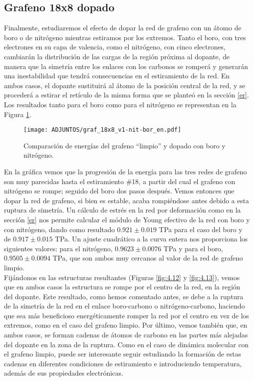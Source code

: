 \subsection{Grafeno 18x8 dopado}

Finalmente, estudiaremos el efecto de dopar la red de grafeno con un átomo de boro o de nitrógeno mientras estiramos por los extremos. Tanto el boro, con tres electrones en su capa de valencia, como el nitrógeno, con cinco electrones, cambiarán la distribución de las cargas de la región próxima al dopante, de manera que la simetría entre los enlaces con los carbonos se romperá y generarán una inestabilidad que tendrá consecuencias en el estiramiento de la red. En ambos casos, el dopante sustituirá al átomo de la posición central de la red, y se procederá a estirar el retículo de la misma forma que se planteó en la sección \ref{er}. Los resultados tanto para el boro como para el nitrógeno se representan en la Figura \ref{fig:4.11}.
 \begin{figure}[!h]
     \centering
     \texttt{[image: ADJUNTOS/graf\_18x8\_v1-nit-bor\_en.pdf]}
     \caption{Comparación de energías del grafeno ``limpio'' y dopado con boro y nitrógeno.}
     \label{fig:4.11}
 \end{figure}
En la gráfica vemos que la progresión de la energía para las tres redes de grafeno son muy parecidas hasta el estiramiento $\#$18, a partir del cual el grafeno con nitrógeno se rompe; seguido del boro dos pasos después. Vemos entonces que dopar la red de grafeno, si bien es estable, acaba rompiéndose antes debido a esta ruptura de simetría. Un cálculo de estrés en la red por deformación como en la sección \ref{er} nos permite calcular el módulo de Young efectivo de la red con boro y con nitrógeno, dando como resultado $0.921 \pm 0.019$ TPa para el caso del boro y de $0.917 \pm 0.015$ TPa. Un ajuste cuadrático a la curva entera nos proporciona los siguientes valores: para el nitrógeno, $0.9623 \pm 0.0076$ TPa y para el boro, $0.9505 \pm 0.0094$ TPa, que son ambos muy cercanos al valor de la red de grafeno limpio.\\

Fijándonos en las estructuras resultantes (Figuras \ref{fig:4.12} y \ref{fig:4.13}), vemos que en ambos casos la estructura se rompe por el centro de la red, en la región del dopante. Este resultado, como hemos comentado antes, se debe a la ruptura de la simetría de la red en el enlace boro-carbono o nitrógeno-carbono, haciendo que sea más beneficioso energéticamente romper la red por el centro en vez de los extremos, como en el caso del grafeno limpio. Por último, vemos también que, en ambos casos, se forman cadenas de átomos de carbono en las partes más alejadas del dopante en la zona de la ruptura. Como en el caso de dinámica molecular con el grafeno limpio, puede ser interesante seguir estudiando la formación de estas cadenas en diferentes condiciones de estiramiento e introduciendo temperatura, además de sus propiedades electrónicas. 

